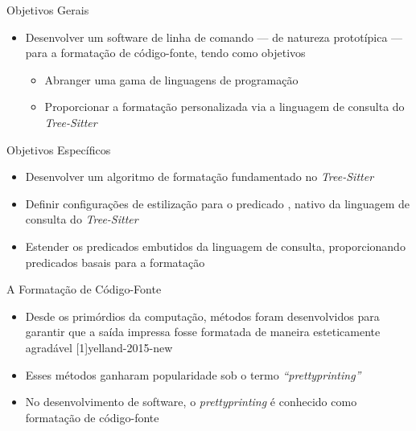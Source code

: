 \documentclass
  [ aspectratio=169,
    english,
    hyperref={citecolor=blue,colorlinks=true,linkcolor=blue,urlcolor=blue},
    brazil]
  {beamer}
\newcommand{\treesitter}{\textit{Tree-Sitter}\xspace}
\begin{document}

  \begin{frame}{Objetivos Gerais}
    \begin{itemize}
      \item Desenvolver um software de linha de comando --- de natureza
            prototípica --- para a formatação de código-fonte, tendo como
            objetivos
            \begin{itemize}
              \item Abranger uma gama de linguagens de programação
              \item Proporcionar a formatação personalizada via a linguagem de
                    consulta do \treesitter
            \end{itemize}
    \end{itemize}
  \end{frame}


  \begin{frame}[containsverbatim]{Objetivos Específicos}
    \begin{itemize}
      \item Desenvolver um algoritmo de formatação fundamentado no \treesitter
      \item Definir configurações de estilização para o predicado
            , nativo da linguagem de consulta do
            \treesitter
      \item Estender os predicados embutidos da linguagem de consulta,
            proporcionando predicados basais para a formatação
    \end{itemize}
  \end{frame}


  \begin{frame}{A Formatação de Código-Fonte}
    \begin{itemize}
      \item Desde os primórdios da computação, métodos foram desenvolvidos para
            garantir que a saída impressa fosse formatada de maneira
            esteticamente agradável
            [1]{yelland-2015-new}
      \item Esses métodos ganharam popularidade sob o termo
            \textit{``prettyprinting''}
      \item No desenvolvimento de software, o \textit{prettyprinting} é
            conhecido como formatação de código-fonte
    \end{itemize}
  \end{frame}
\end{document}
